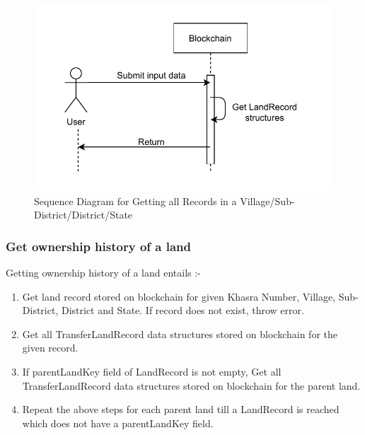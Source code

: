 \documentclass{article}
\begin{document}
        \begin{figure}[htbp]
            \includegraphics[scale=0.25]{blockchain_seq_get_records}
            \centering
            \caption{Sequence Diagram for Getting all Records in a Village/Sub-District/District/State}
        \end{figure}


    \subsubsection{Get ownership history of a land}
        Getting ownership history of a land entails :-
        \begin{enumerate}
            \item Get land record stored on blockchain for given Khasra Number, Village, Sub-District, District and State. If record does not exist, throw error.
            \item Get all TransferLandRecord data structures stored on blockchain for the given record.
            \item If parentLandKey field of LandRecord is not empty, Get all TransferLandRecord data structures stored on blockchain for the parent land.
            \item Repeat the above steps for each parent land till a LandRecord is reached which does not have a parentLandKey field. 
        \end{enumerate}
\end{document}
